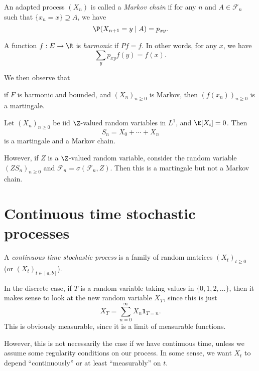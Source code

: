 \documentclass[a4paper]{article}
\begin{document}
\begin{defi}
  An adapted process $(X_n)$ is called a \emph{Markov chain} if for any $n$ and $A \in \mathcal{F}_n$ such that $\{x_n = x\} \supseteq A$, we have
  \[
    \P(X_{n + 1} = y\mid A) = p_{xy}.
  \]
\end{defi}

\begin{defi}
  A function $f: E \to \R$ is \emph{harmonic} if $Pf = f$. In other words, for any $x$, we have
  \[
    \sum_{y} p_{xy} f(y) = f(x).
  \]
\end{defi}
We then observe that

\begin{prop}
  if $F$ is harmonic and bounded, and $(X_n)_{n \geq 0}$ is Markov, then $(f(x_n))_{n \geq 0}$ is a martingale.
\end{prop}

\begin{eg}
  Let $(X_n)_{n \geq 0}$ be iid $\Z$-valued random variables in $L^1$, and $\E[X_i] = 0$. Then
  \[
    S_n = X_0 + \cdots + X_n
  \]
  is a martingale and a Markov chain.

  However, if $Z$ is a $\Z$-valued random variable, consider the random variable $(ZS_n)_{n \geq 0}$ and $\mathcal{F}_n = \sigma(\mathcal{F}_n, Z)$. Then this is a martingale but not a Markov chain.
\end{eg}

\section{Continuous time stochastic processes}
\begin{defi}
  A \emph{continuous time stochastic process} is a family of random matrices $(X_t)_{t \geq 0}$ (or $(X_t)_{t \in [a, b]}$).
\end{defi}

In the discrete case, if $T$ is a random variable taking values in $\{0, 1, 2, \ldots\}$, then it makes sense to look at the new random variable $X_T$, since this is just
\[
  X_T = \sum_{n = 0}^\infty X_n \mathbf{1}_{T = n}.
\]
This is obviously measurable, since it is a limit of measurable functions.

However, this is not necessarily the case if we have continuous time, unless we assume some regularity conditions on our process. In some sense, we want $X_t$ to depend ``continuously'' or at least ``measurably'' on $t$.
\end{document}
